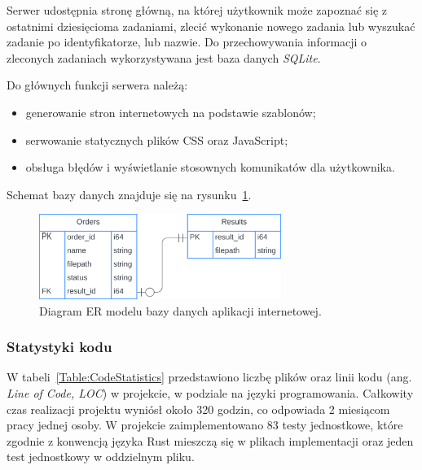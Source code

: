             Serwer udostępnia stronę główną, na której użytkownik może zapoznać się z ostatnimi dziesięcioma zadaniami, zlecić wykonanie nowego zadania lub wyszukać zadanie po identyfikatorze, lub nazwie. Do przechowywania informacji o zleconych zadaniach wykorzystywana jest baza danych \textit{SQLite}.

            Do głównych funkcji serwera należą:
            \begin{itemize}
                \item generowanie stron internetowych na podstawie szablonów;
                \item serwowanie statycznych plików CSS oraz JavaScript;
                \item obsługa błędów i wyświetlanie stosownych komunikatów dla użytkownika.
            \end{itemize}

            Schemat bazy danych znajduje się na rysunku~\ref{Picture:App:Database}.

            \begin{figure}[!htb]
                \begin{center}
                    \includegraphics[width=0.7\textwidth]{tex/pictures/app/database.png}
                \end{center}
                \caption{
                    Diagram ER modelu bazy danych aplikacji internetowej.
                }\label{Picture:App:Database}
              \end{figure}

        \subsubsection{Statystyki kodu}

            W tabeli~\ref{Table:CodeStatistics} przedstawiono liczbę plików oraz linii kodu (ang. \textit{Line of Code, LOC}) w projekcie, w podziale na języki programowania.
            Całkowity czas realizacji projektu wyniósł około 320 godzin, co odpowiada 2 miesiącom pracy jednej osoby. W projekcie zaimplementowano 83 testy jednostkowe, które zgodnie z konwencją języka Rust mieszczą się w plikach implementacji oraz jeden test jednostkowy w oddzielnym pliku.

